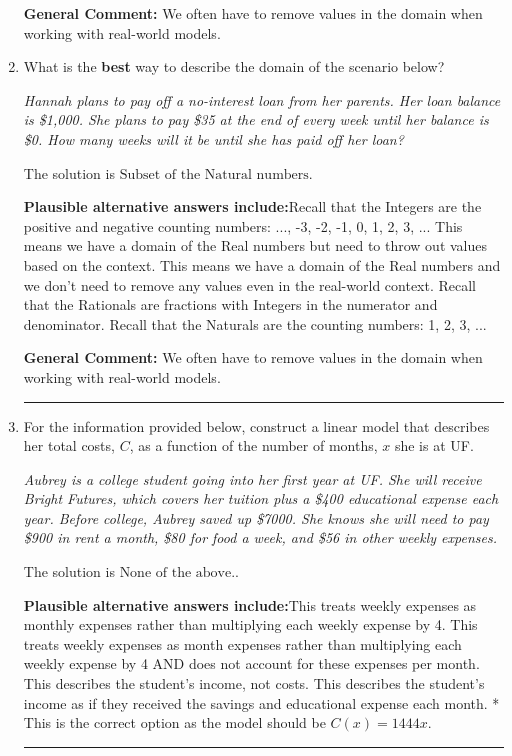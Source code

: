 \documentclass{extbook}[14pt]
\newcommand{\litem}[1]{\item #1

\rule{\textwidth}{0.4pt}}
\begin{document}
\begin{enumerate}
{\textbf{General Comment:} We often have to remove values in the domain when working with real-world models.
}
\litem{
What is the \textbf{best} way to describe the domain of the scenario below?

\begin{center}
    \textit{ Hannah plans to pay off a no-interest loan from her parents. Her loan balance is \$1,000. She plans to pay \$35 at the end of every week until her balance is \$0. How many weeks will it be until she has paid off her loan? }
\end{center}
The solution is \( \text{Subset of the Natural numbers} \).\begin{enumerate}[label=\Alph*.]
\textbf{Plausible alternative answers include:}Recall that the Integers are the positive and negative counting numbers: ..., -3, -2, -1, 0, 1, 2, 3, ... 
This means we have a domain of the Real numbers but need to throw out values based on the context.
This means we have a domain of the Real numbers and we don't need to remove any values even in the real-world context.
Recall that the Rationals are fractions with Integers in the numerator and denominator.
Recall that the Naturals are the counting numbers: 1, 2, 3, ...
\end{enumerate}

\textbf{General Comment:} We often have to remove values in the domain when working with real-world models.
}
\litem{
For the information provided below, construct a linear model that describes her total costs, $C$, as a function of the number of months, $x$ she is at UF. 

\begin{center}
    \textit{ Aubrey is a college student going into her first year at UF. She will receive Bright Futures, which covers her tuition plus a \$400 educational expense each year. Before college, Aubrey saved up \$7000. She knows she will need to pay \$900 in rent a month, \$80 for food a week, and \$56 in other weekly expenses. }
\end{center}
The solution is \( \text{None of the above.} \).\begin{enumerate}[label=\Alph*.]
\textbf{Plausible alternative answers include:}This treats weekly expenses as monthly expenses rather than multiplying each weekly expense by 4.
This treats weekly expenses as month expenses rather than multiplying each weekly expense by 4 AND does not account for these expenses per month.
This describes the student's income, not costs.
This describes the student's income as if they received the savings and educational expense each month.
* This is the correct option as the model should be $C(x) = 1444 x$.
\end{enumerate}

}
\end{enumerate}
\end{document}
